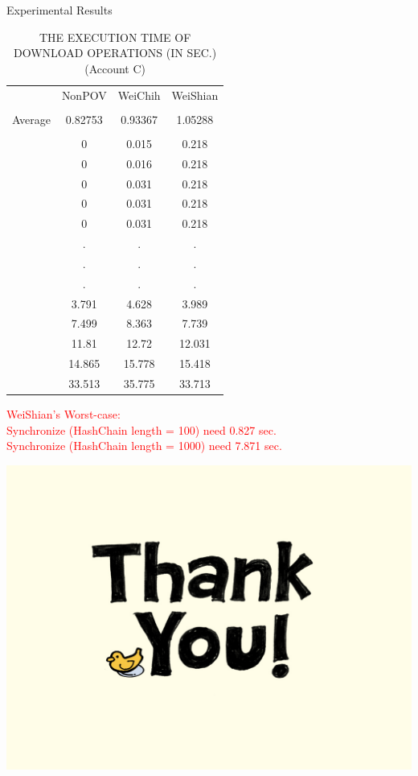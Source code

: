 \documentclass{beamer}
\newcommand{\tab}[1]{\hspace{.1\textwidth}\rlap{#1}}
\begin{document}
\begin{CJK}{UTF8}{bkai}
\begin{frame}{Experimental Results}
	\scriptsize	
	\begin{table}[]
		\centering
		\captionsetup{justification=centering}
		\caption{\tiny THE EXECUTION TIME OF \alert{DOWNLOAD} OPERATIONS (IN SEC.) (Account C)}
		\begin{tabular}{|cccc|}
				 & NonPOV  & WeiChih   & WeiShian \\
				 &         &           &          \\
		Average	 & 0.82753 & 0.93367   & 1.05288  \\
				 &         &           &          \\
				 & 0       & 0.015     & 0.218    \\
				 & 0       & 0.016     & 0.218    \\
				 & 0       & 0.031     & 0.218    \\
				 & 0       & 0.031     & 0.218    \\
				 & 0       & 0.031     & 0.218    \\
				 & .       & .         & .        \\
				 & .       & .         & .        \\
				 & .       & .         & .        \\
				 & 3.791   & 4.628     & 3.989    \\
				 & 7.499   & 8.363     & 7.739    \\
				 & 11.81   & 12.72     & 12.031   \\
				 & 14.865  & 15.778    & 15.418   \\
				 & 33.513  & 35.775    & 33.713
		\end{tabular}
	\end{table}
	\textcolor{red}{
	WeiShian's Worst-case: \\
	\tab{}\tab{}Synchronize (HashChain length = 100) need 0.827 sec.\\
	\tab{}\tab{}Synchronize (HashChain length = 1000) need 7.871 sec.
	}
\end{frame}

\begin{frame}
	\begin{center}
		\includegraphics[width=\textwidth]{thank_you.jpg}
	\end{center}	
\end{frame}

\end{CJK}
\end{document}
